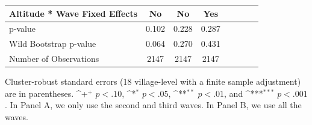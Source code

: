 \documentclass[fleqn,11pt]{article}
\newcommand{\sym}[1]{\rlap{$#1$}}
\def\sym#1{\ifmmode^{#1}\else\(^{#1}\)\fi
}
\begin{document}
\begin{table}[h]
\begin{adjustbox}{max width=\textwidth}
\begin{threeparttable}
\begin{tabular}{l*{7}{c}}
Altitude * Wave Fixed Effects&          No         &          No         &         Yes        &&& \\
\hline
p-value     &       0.102         &       0.228         &       0.287     &&&\\
Wild Bootstrap p-value &       0.064         &       0.270         &       0.431  &&&\\       
Number of Observations        &        2147         &        2147         &        2147        &&& \\
\hline\hline
\end{tabular}
\begin{tablenotes}
\item Cluster-robust standard errors (18 village-level with a finite sample adjustment) are in parentheses. \sym{+} \(p<.10\), \sym{*} \(p<.05\), \sym{**} \(p<.01\), and \sym{***} \(p<.001\). In Panel A, we only use the second and third waves. In Panel B, we use all the waves.
\end{tablenotes}
\end{threeparttable}
\end{adjustbox}
\end{table}
\end{document}
